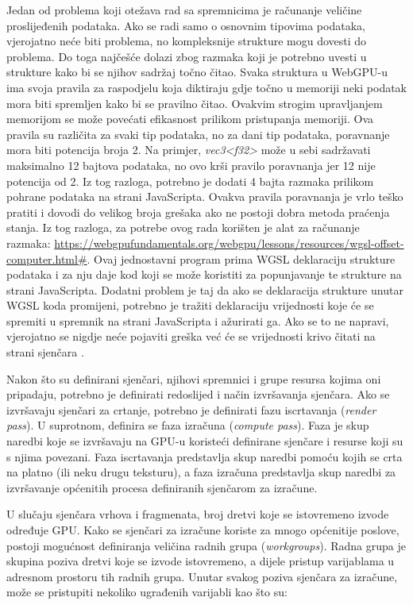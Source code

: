 \documentclass{foi}
\begin{document}
Jedan od problema koji otežava rad sa spremnicima je računanje veličine proslijeđenih podataka. Ako se radi samo o osnovnim tipovima podataka, vjerojatno neće biti problema, no kompleksnije strukture mogu dovesti do problema. Do toga najčešće dolazi zbog razmaka koji je potrebno uvesti u strukture kako bi se njihov sadržaj točno čitao. Svaka struktura u WebGPU-u ima svoja pravila za raspodjelu koja diktiraju gdje točno u memoriji neki podatak mora biti spremljen kako bi se pravilno čitao. Ovakvim strogim upravljanjem memorijom se može povećati efikasnost prilikom pristupanja memoriji. Ova pravila su različita za svaki tip podataka, no za dani tip podataka, poravnanje mora biti potencija broja 2. Na primjer, \textit{vec3<f32>}  može u sebi sadržavati maksimalno 12 bajtova podataka, no ovo krši pravilo poravnanja jer 12 nije potencija od 2. Iz tog razloga, potrebno je dodati 4 bajta razmaka prilikom pohrane podataka na strani JavaScripta. Ovakva pravila poravnanja je vrlo teško pratiti i dovodi do velikog broja grešaka ako ne postoji dobra metoda praćenja stanja. Iz tog razloga, za potrebe ovog rada korišten je alat za računanje razmaka: \url{https://webgpufundamentals.org/webgpu/lessons/resources/wgsl-offset-computer.html#}. Ovaj jednostavni program prima WGSL deklaraciju strukture podataka i za nju daje kod koji se može koristiti za popunjavanje te strukture na strani JavaScripta. Dodatni problem je taj da ako se deklaracija strukture unutar WGSL koda promijeni, potrebno je tražiti deklaraciju vrijednosti koje će se spremiti u spremnik na strani JavaScripta i ažurirati ga. Ako se to ne napravi, vjerojatno se nigdje neće pojaviti greška već će se vrijednosti krivo čitati na strani sjenčara \parencite{WebGPUFundamentalsMemoryLayout}.



Nakon što su definirani sjenčari, njihovi spremnici  i grupe resursa kojima oni pripadaju, potrebno je definirati redoslijed i način izvršavanja sjenčara. Ako se izvršavaju sjenčari za crtanje, potrebno je definirati fazu iscrtavanja (\textit{render pass}). U suprotnom, definira se faza izračuna (\textit{compute pass}). Faza je skup naredbi koje se izvršavaju na GPU-u koristeći definirane sjenčare i resurse koji su s njima povezani. Faza iscrtavanja predstavlja skup naredbi pomoću kojih se crta na platno (ili neku drugu teksturu), a faza izračuna predstavlja skup naredbi za izvršavanje općenitih procesa definiranih sjenčarom za izračune.  

U slučaju sjenčara vrhova i fragmenata, broj dretvi koje se istovremeno izvode određuje GPU. Kako se sjenčari za izračune koriste za mnogo općenitije poslove, postoji mogućnost definiranja veličina radnih grupa (\textit{workgroups}). Radna grupa je skupina poziva dretvi koje se izvode istovremeno, a dijele pristup varijablama u adresnom prostoru tih radnih grupa. Unutar svakog poziva sjenčara za izračune, može se pristupiti nekoliko ugrađenih varijabli kao što su:
\end{document}
